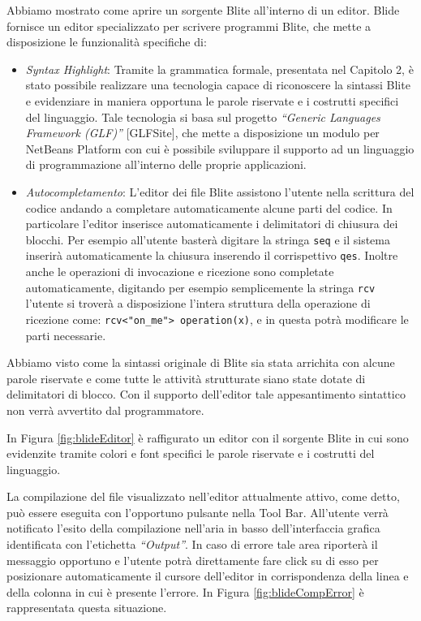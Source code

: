 Abbiamo mostrato come aprire un sorgente Blite all'interno di un editor. Blide
fornisce un editor specializzato per scrivere programmi Blite, che mette a
disposizione le funzionalità specifiche di:

\begin{itemize}
  \item \emph{Syntax Highlight}: Tramite la grammatica formale, presentata
  nel Capitolo 2,  è stato possibile realizzare una tecnologia capace di 
  riconoscere la sintassi Blite e evidenziare in maniera opportuna le parole
  riservate  e i costrutti specifici del linguaggio. Tale tecnologia si basa
  sul progetto \emph{``Generic Languages Framework (GLF)''} [GLFSite], che mette
  a disposizione un modulo per NetBeans Platform con cui è possibile sviluppare 
  il supporto ad un linguaggio di programmazione all'interno delle proprie 
  applicazioni.
  
  \item \emph{Autocompletamento}: L'editor dei file Blite assistono
  l'utente nella scrittura del codice andando a completare automaticamente
  alcune parti del codice. In particolare l'editor inserisce automaticamente i
  delimitatori di chiusura dei blocchi. Per esempio all'utente basterà digitare
  la stringa \texttt{seq} e il sistema inserirà automaticamente la chiusura
  inserendo il corrispettivo \texttt{qes}. Inoltre anche le operazioni di
  invocazione e ricezione sono completate automaticamente, digitando per
  esempio semplicemente la stringa \texttt{rcv} l'utente si troverà a
  disposizione l'intera struttura della operazione di ricezione come: 
  \verb#rcv<"on_me"> operation(x)#, e in questa potrà modificare
  le parti necessarie.
  
\end{itemize}

Abbiamo visto come la sintassi originale di Blite sia stata arrichita con
alcune parole riservate e come tutte le attività strutturate siano state
dotate di delimitatori di blocco. Con il supporto dell'editor tale
appesantimento sintattico non verrà avvertito dal programmatore.
  
In Figura \ref{fig:blideEditor} è raffigurato un editor con il sorgente Blite in
cui sono evidenzite tramite colori e font specifici le parole riservate e i costrutti
del linguaggio.
	
La compilazione del file visualizzato nell'editor attualmente attivo, come
detto, può essere eseguita con l'opportuno pulsante nella Tool Bar. All'utente
verrà notificato l'esito della compilazione nell'aria in basso
dell'interfaccia grafica identificata con l'etichetta \emph{``Output''}. In caso di
errore tale area riporterà il messaggio opportuno e l'utente potrà direttamente
fare click su di esso per posizionare automaticamente il cursore dell'editor in
corrispondenza della linea e della colonna in cui è presente l'errore. In
Figura \ref{fig:blideCompError} è rappresentata questa situazione.

